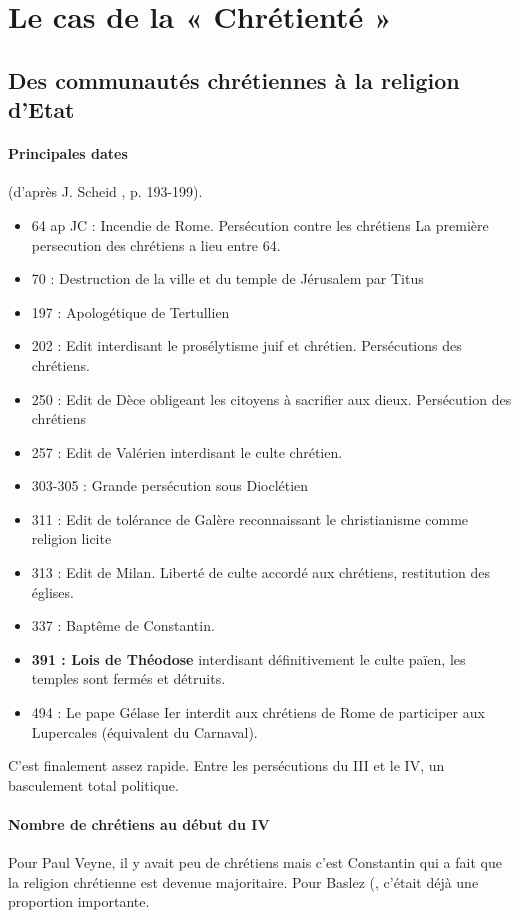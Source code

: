 \section{Le cas de la  « Chrétienté »}

\subsection{Des communautés chrétiennes à la religion d’Etat }
  
\paragraph{Principales dates} (d’après J. Scheid , p. 193-199).
\begin{itemize}
    \item  64 ap JC : Incendie de Rome. Persécution contre les chrétiens La première persecution des chrétiens a lieu entre 64.
    \item 70 : Destruction de la ville et du temple de Jérusalem par Titus 
    \item 197 : Apologétique de Tertullien 
    \item 202 : Edit interdisant le prosélytisme juif et chrétien. Persécutions des chrétiens. 
    \item 250 : Edit de Dèce obligeant les citoyens à sacrifier aux dieux. Persécution des chrétiens 
    \item 257 : Edit de Valérien interdisant le culte chrétien. 
    \item 303-305 : Grande persécution sous Dioclétien 
    \item 311 : Edit de tolérance de Galère reconnaissant le christianisme comme religion licite 
    \item 313 : Edit de Milan. Liberté de culte accordé aux chrétiens, restitution des églises. 
    \item 337 : Baptême de Constantin. 
    \item \textbf{391 : Lois de Théodose }interdisant définitivement le culte païen, les temples sont fermés et détruits. 
    \item 494 : Le pape Gélase Ier interdit aux chrétiens de Rome de participer aux Lupercales (équivalent du Carnaval). 
\end{itemize}
 C'est finalement assez rapide. Entre les persécutions du III et le IV, un basculement total politique.
 
 \paragraph{Nombre de chrétiens au début du IV} Pour Paul Veyne, il y avait peu de chrétiens mais c'est Constantin qui a fait que la religion chrétienne est devenue majoritaire. Pour Baslez (\cite{Baslez:MondeDevnuChretien}, c'était déjà une proportion importante. 
 
